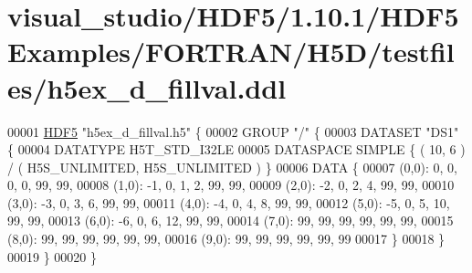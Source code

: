 \hypertarget{visual__studio_2_h_d_f5_21_810_81_2_h_d_f5_examples_2_f_o_r_t_r_a_n_2_h5_d_2testfiles_2h5ex__d__fillval_8ddl_source}{}\section{visual\+\_\+studio/\+H\+D\+F5/1.10.1/\+H\+D\+F5\+Examples/\+F\+O\+R\+T\+R\+A\+N/\+H5\+D/testfiles/h5ex\+\_\+d\+\_\+fillval.ddl}
\label{visual__studio_2_h_d_f5_21_810_81_2_h_d_f5_examples_2_f_o_r_t_r_a_n_2_h5_d_2testfiles_2h5ex__d__fillval_8ddl_source}

\begin{DoxyCode}
00001 \hyperlink{namespace_h_d_f5}{HDF5} \textcolor{stringliteral}{"h5ex\_d\_fillval.h5"} \{
00002 GROUP \textcolor{stringliteral}{"/"} \{
00003    DATASET \textcolor{stringliteral}{"DS1"} \{
00004       DATATYPE  H5T\_STD\_I32LE
00005       DATASPACE  SIMPLE \{ ( 10, 6 ) / ( H5S\_UNLIMITED, H5S\_UNLIMITED ) \}
00006       DATA \{
00007       (0,0): 0, 0, 0, 0, 99, 99,
00008       (1,0): -1, 0, 1, 2, 99, 99,
00009       (2,0): -2, 0, 2, 4, 99, 99,
00010       (3,0): -3, 0, 3, 6, 99, 99,
00011       (4,0): -4, 0, 4, 8, 99, 99,
00012       (5,0): -5, 0, 5, 10, 99, 99,
00013       (6,0): -6, 0, 6, 12, 99, 99,
00014       (7,0): 99, 99, 99, 99, 99, 99,
00015       (8,0): 99, 99, 99, 99, 99, 99,
00016       (9,0): 99, 99, 99, 99, 99, 99
00017       \}
00018    \}
00019 \}
00020 \}
\end{DoxyCode}
